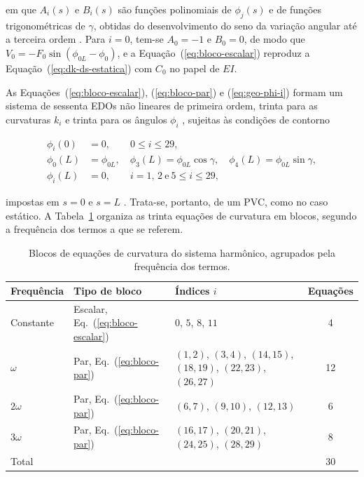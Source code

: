 \documentclass[arial,centeredequations,english,brazilian,oneside,section=TITLE]{ifes8}
\begin{document}
em que $A_i(s)$ e $B_i(s)$ são funções polinomiais de $\phi_j(s)$ e de funções
trigonométricas de $\gamma$, obtidas do desenvolvimento do seno da variação angular até a
terceira ordem \cite{Caire2011}. Para $i = 0$, tem-se $A_0 = -1$ e $B_0 = 0$,
de modo que $V_0 = -F_0\sin(\phi_{0L} - \phi_0)$, e a Equação~(\ref{eq:bloco-escalar})
reproduz a Equação~(\ref{eq:dk-ds-estatica}) com $C_0$ no papel de $EI$.
 
As Equações~(\ref{eq:bloco-escalar}), (\ref{eq:bloco-par}) e (\ref{eq:geo-phi-i}) formam
um sistema de sessenta EDOs não lineares de primeira ordem, trinta para as curvaturas
$k_i$ e trinta para os ângulos $\phi_i$ \cite{Caire2011}, sujeitas às condições de
contorno

\begin{align}
  \phi_i(0) &= 0, \qquad 0 \le i \le 29, \label{eq:cc-0}\\
  \phi_0(L) &= \phi_{0L}, \quad \phi_3(L) = \phi_{0L}\cos\gamma, \quad
  \phi_4(L) = \phi_{0L}\sin\gamma, \label{eq:cc-L1}\\
  \phi_i(L) &= 0, \qquad i = 1,\, 2 \ \text{e}\ 5 \le i \le 29, \label{eq:cc-L2}
\end{align}

impostas em $s = 0$ e $s = L$ \cite{Caire2011}. Trata-se, portanto, de um PVC,
como no caso estático. A Tabela~\ref{tab:blocos} organiza as trinta equações de curvatura
em blocos, segundo a frequência dos termos a que se referem.
 
\begin{table}[h]
  \caption{Blocos de equações de curvatura do sistema harmônico, agrupados pela
    frequência dos termos.}
  \label{tab:blocos}
  \begin{center}
    \begin{tabular}{llp{6.2cm}c}
      \toprule
      Frequência & Tipo de bloco & Índices $i$ & Equações \\
      \midrule
      Constante & Escalar, Eq.~(\ref{eq:bloco-escalar}) & $0$, $5$, $8$, $11$ & 4 \\
      $\omega$ & Par, Eq.~(\ref{eq:bloco-par})
        & $(1,2)$, $(3,4)$, $(14,15)$, $(18,19)$, $(22,23)$, $(26,27)$ & 12 \\
      $2\omega$ & Par, Eq.~(\ref{eq:bloco-par})
        & $(6,7)$, $(9,10)$, $(12,13)$ & 6 \\
      $3\omega$ & Par, Eq.~(\ref{eq:bloco-par})
        & $(16,17)$, $(20,21)$, $(24,25)$, $(28,29)$ & 8 \\
      \midrule
      \multicolumn{3}{l}{Total} & 30 \\
      \bottomrule
    \end{tabular}
  \end{center}
\end{table}
 
\end{document}
